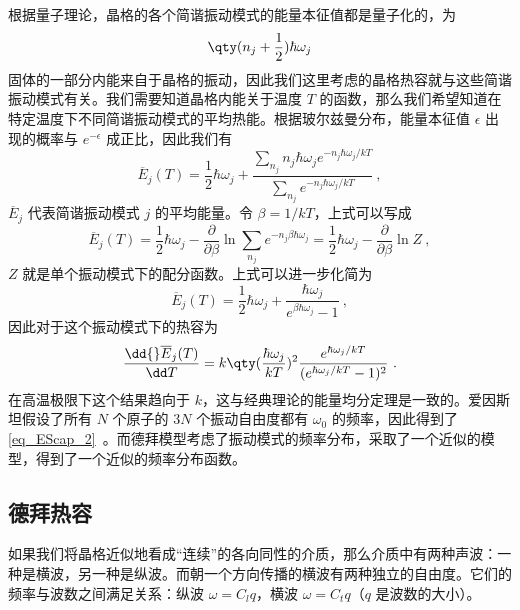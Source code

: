 

根据量子理论，晶格的各个简谐振动模式的能量本征值都是量子化的，为
\begin{equation}
\qty(n_j+\frac{1}{2})\hbar \omega_j
\end{equation}
固体的一部分内能来自于晶格的振动，因此我们这里考虑的晶格热容就与这些简谐振动模式有关。我们需要知道晶格内能关于温度 $T$ 的函数，那么我们希望知道在特定温度下不同简谐振动模式的平均热能。根据玻尔兹曼分布，能量本征值 $\epsilon$ 出现的概率与 $e^{-\epsilon}$ 成正比，因此我们有
\begin{equation}
\overline E_j(T)=\frac{1}{2}\hbar \omega_j + \frac{\sum_{n_j} n_j\hbar \omega_j e^{-n_j \hbar \omega_j / kT}}{\sum_{n_j} e^{-n_j \hbar \omega_j / kT}}~,
\end{equation}
$\overline E_j$ 代表简谐振动模式 $j$ 的平均能量。令 $\beta=1/kT$，上式可以写成
\begin{equation}
\overline E_j(T)=\frac{1}{2}\hbar \omega_j - \frac{\partial}{\partial \beta} \ln \sum_{n_j} e^{-n_j\beta\hbar\omega_j}=\frac{1}{2}\hbar \omega_j - \frac{\partial}{\partial \beta} \ln Z~,
\end{equation}
$Z$ 就是单个振动模式下的配分函数。上式可以进一步化简为
\begin{equation}
\overline E_j(T)=\frac{1}{2}\hbar \omega_j + \frac{\hbar \omega_j}{e^{\beta\hbar\omega_j}-1}~,
\end{equation}
因此对于这个振动模式下的热容为
\begin{equation}
\frac{\dd{} \overline E_j(T)}{\dd T}=k \qty(\frac{\hbar\omega_j}{kT})^2\frac{e^{\hbar \omega_j/kT}}{(e^{\hbar\omega_j/kT}-1)^2}~.
\end{equation}
在高温极限下这个结果趋向于 $k$，这与经典理论的能量均分定理是一致的。爱因斯坦假设了所有 $N$ 个原子的 $3N$ 个振动自由度都有 $\omega_0$ 的频率，因此得到了\autoref{eq_EScap_2}~。而德拜模型考虑了振动模式的频率分布，采取了一个近似的模型，得到了一个近似的频率分布函数。

\subsection{德拜热容}
如果我们将晶格近似地看成“连续”的各向同性的介质，那么介质中有两种声波：一种是横波，另一种是纵波。而朝一个方向传播的横波有两种独立的自由度。它们的频率与波数之间满足关系：纵波 $\omega=C_l q$，横波 $\omega=C_t q$（$q$ 是波数的大小）。

